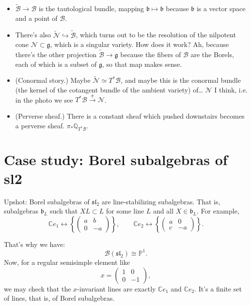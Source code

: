 \noindent
\begin{itemize}
\item $\widetilde{\mathcal{B}} \to \mathcal{B}$
is the tautological bundle,
mapping $\mathfrak{b} \mapsto  \mathfrak{b}$
because $\mathfrak{b}$ is a vector space
and a point of $\mathcal{B}$.

\item There's also $\widetilde{\mathcal{N}}
\hookrightarrow \widetilde{\mathcal{B}}$,
which turns out to be the resolution
of the nilpotent cone
$\mathcal{N} \subset\mathfrak{g}$,
which is a singular variety.
How does it work? Ah, because
there's the other projection
$\widetilde{\mathcal{B}} \to \mathfrak{g}$
because the fibers of $\mathcal{B}$
are the Borels, each of which is a subset
of $\mathfrak{g}$, so that map makes sense.

\item (Conormal story.)
Maybe $\widetilde{\mathcal{N}} \simeq
T^*\mathcal{B}$, and maybe this is
the conormal bundle
(the kernel of the cotangent bundle of
the ambient variety)
of… $\mathcal{N}$ I think, i.e. in the
photo we see $T^*  \mathcal{B}
\xrightarrow{\pi}\mathcal{N}$.

\item (Perverse sheaf.) There is a constant
sheaf which pushed downstairs becomes a
perverse sheaf.
$\pi_*\mathbb{Q}_{T^*\mathcal{B}}$.
\end{itemize}
\section{Case study: Borel subalgebras of 
sl2}
\label{section-borel-subalgebras-sl2}

\noindent
Upshot: Borel subalgebras of $\mathfrak{sl}_2$
are line-stabilizing subalgebras.
That is, subalgebras $\mathfrak{b}_L$ such that
$XL \subset L$ for some line $L$
and all $X \in \mathfrak{b}_L$.
For example,
$$
\mathbb C e_1
\longleftrightarrow
\left\{
\begin{pmatrix}
a&b\\
0&-a
\end{pmatrix}
\right\},
\qquad
\mathbb C e_2
\longleftrightarrow
\left\{
\begin{pmatrix}
a&0\\
c&-a
\end{pmatrix}
\right\}.
$$

That's why we have:
$$
\mathcal{B}(\mathfrak{sl}_2)
\cong
\mathbb{P}^1.
$$
Now, for a regular semisimple element
like
$$
x = \begin{pmatrix}1&0\\ 0&-1\end{pmatrix},
$$
we may check that the $x$-invariant
lines are exactly $\mathbb{C}e_1$
and $\mathbb{C}e_2$. It's a finite set
of lines, that is, of Borel subalgebras.

